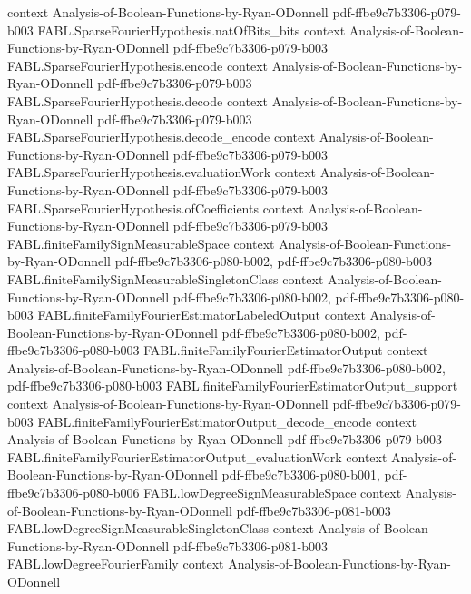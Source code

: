 \begin{theorem}
  {context}
  {Analysis-of-Boolean-Functions-by-Ryan-ODonnell}
  {pdf-ffbe9c7b3306-p079-b003}
\proofstep
  {FABL.SparseFourierHypothesis.natOfBits_bits}
  {context}
  {Analysis-of-Boolean-Functions-by-Ryan-ODonnell}
  {pdf-ffbe9c7b3306-p079-b003}
\proofstep
  {FABL.SparseFourierHypothesis.encode}
  {context}
  {Analysis-of-Boolean-Functions-by-Ryan-ODonnell}
  {pdf-ffbe9c7b3306-p079-b003}
\proofstep
  {FABL.SparseFourierHypothesis.decode}
  {context}
  {Analysis-of-Boolean-Functions-by-Ryan-ODonnell}
  {pdf-ffbe9c7b3306-p079-b003}
\proofstep
  {FABL.SparseFourierHypothesis.decode_encode}
  {context}
  {Analysis-of-Boolean-Functions-by-Ryan-ODonnell}
  {pdf-ffbe9c7b3306-p079-b003}
\proofstep
  {FABL.SparseFourierHypothesis.evaluationWork}
  {context}
  {Analysis-of-Boolean-Functions-by-Ryan-ODonnell}
  {pdf-ffbe9c7b3306-p079-b003}
\proofstep
  {FABL.SparseFourierHypothesis.ofCoefficients}
  {context}
  {Analysis-of-Boolean-Functions-by-Ryan-ODonnell}
  {pdf-ffbe9c7b3306-p079-b003}
\proofstep
  {FABL.finiteFamilySignMeasurableSpace}
  {context}
  {Analysis-of-Boolean-Functions-by-Ryan-ODonnell}
  {pdf-ffbe9c7b3306-p080-b002,
    pdf-ffbe9c7b3306-p080-b003}
\proofstep
  {FABL.finiteFamilySignMeasurableSingletonClass}
  {context}
  {Analysis-of-Boolean-Functions-by-Ryan-ODonnell}
  {pdf-ffbe9c7b3306-p080-b002,
    pdf-ffbe9c7b3306-p080-b003}
\proofstep
  {FABL.finiteFamilyFourierEstimatorLabeledOutput}
  {context}
  {Analysis-of-Boolean-Functions-by-Ryan-ODonnell}
  {pdf-ffbe9c7b3306-p080-b002,
    pdf-ffbe9c7b3306-p080-b003}
\proofstep
  {FABL.finiteFamilyFourierEstimatorOutput}
  {context}
  {Analysis-of-Boolean-Functions-by-Ryan-ODonnell}
  {pdf-ffbe9c7b3306-p080-b002,
    pdf-ffbe9c7b3306-p080-b003}
\proofstep
  {FABL.finiteFamilyFourierEstimatorOutput_support}
  {context}
  {Analysis-of-Boolean-Functions-by-Ryan-ODonnell}
  {pdf-ffbe9c7b3306-p079-b003}
\proofstep
  {FABL.finiteFamilyFourierEstimatorOutput_decode_encode}
  {context}
  {Analysis-of-Boolean-Functions-by-Ryan-ODonnell}
  {pdf-ffbe9c7b3306-p079-b003}
\proofstep
  {FABL.finiteFamilyFourierEstimatorOutput_evaluationWork}
  {context}
  {Analysis-of-Boolean-Functions-by-Ryan-ODonnell}
  {pdf-ffbe9c7b3306-p080-b001,
    pdf-ffbe9c7b3306-p080-b006}
\proofstep
  {FABL.lowDegreeSignMeasurableSpace}
  {context}
  {Analysis-of-Boolean-Functions-by-Ryan-ODonnell}
  {pdf-ffbe9c7b3306-p081-b003}
\proofstep
  {FABL.lowDegreeSignMeasurableSingletonClass}
  {context}
  {Analysis-of-Boolean-Functions-by-Ryan-ODonnell}
  {pdf-ffbe9c7b3306-p081-b003}
\proofstep
  {FABL.lowDegreeFourierFamily}
  {context}
  {Analysis-of-Boolean-Functions-by-Ryan-ODonnell}

\end{theorem}
